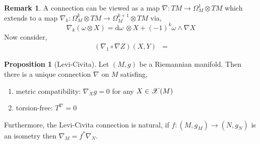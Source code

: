 \documentclass[12pt]{extarticle}
\renewcommand{\d}[1]{ \mathrm{d}#1 \:}
\theoremstyle{definition}
\newtheorem{proposition}[theorem]{Proposition}
\newtheorem{remark}{Remark}
\begin{document}
\begin{remark}
A connection can be viewed as a map $\nabla : TM \to \Omega_M^1 \otimes TM$ which extends to a map $\nabla_k : \Omega^k_M \otimes TM \to \Omega_M^{k+1} \otimes TM$ via,
\[ \nabla_k (\omega \otimes X) = \d{\omega} \otimes X + (-1)^k \omega \wedge \nabla X \]
Now consider,
\begin{align*}
(\nabla_1 \circ \nabla Z)(X, Y) & = 
\end{align*} 
\end{remark}

\begin{proposition}[Levi-Civita]
Let $(M, g)$ be a Riemannian manifold. Then there is a unique connection $\nabla$ on $M$ satisfing,
\begin{enumerate}
\item metric compatibility: $\nabla_X g = 0$ for any $X \in \mathscr{X}(M)$
\item torsion-free: $T^\nabla = 0$
\end{enumerate}
Furthermore, the Levi-Civita connection is natural, if $f : (M, g_M) \to (N, g_N)$ is an isometry then $\nabla_M = f^* \nabla_N$.
\end{proposition}
\end{document}
